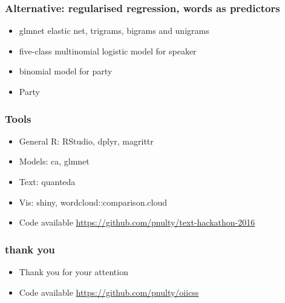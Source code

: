 \documentclass[11pt, table, dvipsnames]{beamer}
\begin{document}
\begin{frame}
  \frametitle{Alternative: regularised regression, words as predictors} 
  \begin{itemize}
  \item glmnet elastic net, trigrams, bigrams and unigrams
  \item five-class multinomial logistic model for speaker
  \item binomial model for party
  \item Party 
  \end{itemize}
\end{frame}


\begin{frame}
  \frametitle{Tools} 
  \begin{itemize}
  \item General R: RStudio, dplyr, magrittr
  \item Models: ca, glmnet
  \item Text: quanteda 
  \item Vis: shiny, wordcloud::comparison.cloud
  \item Code available \url{https://github.com/pnulty/text-hackathon-2016}
  \end{itemize}
\end{frame}

\begin{frame}
  \frametitle{thank you} 
  \begin{itemize}
  \item Thank you for your attention
  \item Code available \url{https://github.com/pnulty/oiicss}
  \end{itemize}
\end{frame}
\end{document}
